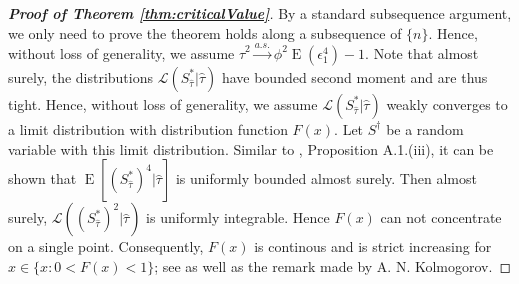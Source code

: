 \documentclass[11pt]{article}
\DeclareMathOperator{\myE}{E}
\theoremstyle{plain}
\theoremstyle{definition}
\theoremstyle{remark}
\begin{document}
\begin{proof}[\textbf{Proof of Theorem \ref{thm:criticalValue}}]
    By a standard subsequence argument, we only need to prove the theorem holds along a subsequence of $\{n\}$.
    Hence, without loss of generality, we assume $\hat \tau^2 \xrightarrow{a.s.} \phi^2 \myE (\epsilon_1^4)-1$.
    Note that almost surely, the distributions $\mathcal L (S_{\hat \tau}^*  |\hat \tau)$
    have bounded second moment and are thus tight.
    Hence, without loss of generality, we assume $\mathcal L (S_{\hat \tau}^*  |\hat \tau)$ weakly converges to a limit distribution with distribution function $F(x)$.
    Let $S^\dagger$ be a random variable with this limit distribution.
    Similar to \cite{chen2010tests}, Proposition A.1.(iii), it can be shown that $\myE [(S^*_{\hat \tau})^4|\hat \tau]$ is uniformly bounded almost surely.
    Then almost surely, $\mathcal L ((S_{\hat \tau}^*)^2  |\hat \tau)$ is  uniformly integrable.
    Hence $F(x)$ can not concentrate on a single point.
    Consequently, $F(x)$ is continous and is strict increasing for $x\in\{x:0<F(x)<1\}$; see \cite{Sevast1961A} as well as the remark made by A. N. Kolmogorov.


\end{proof}
\end{document}
